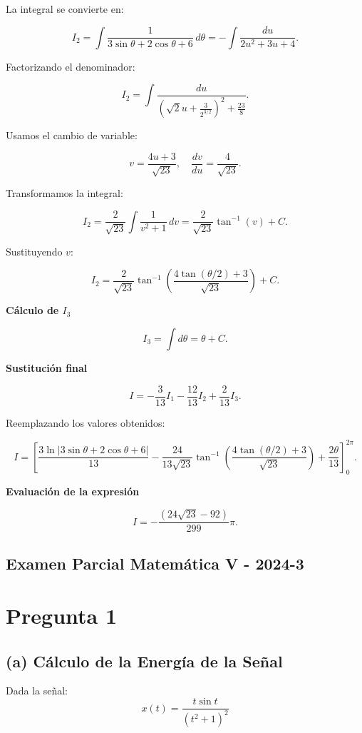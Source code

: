 \documentclass[a4paper,12pt]{article}
\begin{document}
La integral se convierte en:

\[
I_2 = \int \frac{1}{3 \sin \theta + 2 \cos \theta + 6} \, d\theta
= -\int \frac{du}{2u^2 + 3u + 4}.
\]

Factorizando el denominador:

\[
I_2 = \int \frac{du}{\left(\sqrt{2} u + \frac{3}{2^{3/2}}\right)^2 + \frac{23}{8}}.
\]

Usamos el cambio de variable:

\[
v = \frac{4u + 3}{\sqrt{23}}, \quad \frac{dv}{du} = \frac{4}{\sqrt{23}}.
\]

Transformamos la integral:

\[
I_2 = \frac{2}{\sqrt{23}} \int \frac{1}{v^2 + 1} \, dv
= \frac{2}{\sqrt{23}} \tan^{-1}(v) + C.
\]

Sustituyendo \( v \):

\[
I_2 = \frac{2}{\sqrt{23}} \tan^{-1} \left( \frac{4 \tan (\theta/2) + 3}{\sqrt{23}} \right) + C.
\]

{\bf Cálculo de \(I_3\)}

\[
I_3 = \int d\theta = \theta + C.
\]

{\bf Sustitución final}

\[
I = -\frac{3}{13} I_1 - \frac{12}{13} I_2 + \frac{2}{13} I_3.
\]

Reemplazando los valores obtenidos:

\[
I = \left[ \frac{3 \ln |3 \sin \theta + 2 \cos \theta + 6|}{13} 
- \frac{24}{13\sqrt{23}} \tan^{-1} \left( \frac{4 \tan (\theta/2) + 3}{\sqrt{23}} \right) 
+ \frac{2\theta}{13} \right]_{0}^{2\pi}.
\]

{\bf Evaluación de la expresión}

\[
I = -\frac{(24 \sqrt{23} - 92)}{299} \pi.
\]
\newpage
\subsection{Examen Parcial Matemática V - 2024-3}
\section*{Pregunta 1}
\subsection*{(a) Cálculo de la Energía de la Señal}

Dada la señal:
\begin{equation*}
    x(t) = \frac{t \sin t}{(t^2+1)^2}
\end{equation*}
\end{document}
